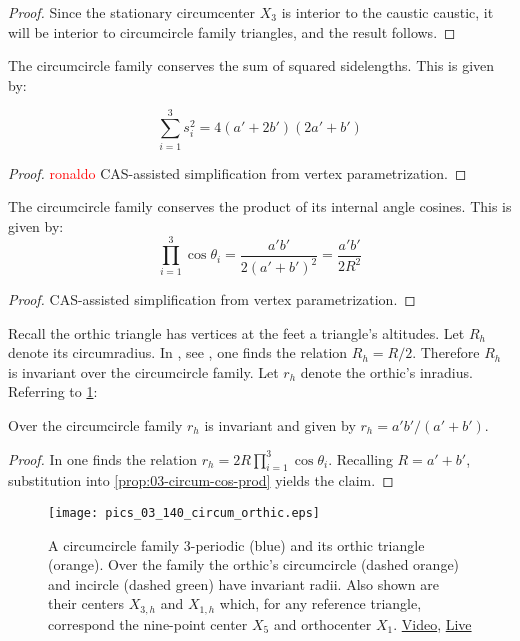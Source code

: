 \begin{proof}
Since the stationary circumcenter $X_3$ is interior to the caustic caustic, it will be interior to circumcircle family triangles, and the result follows.
\end{proof}

\begin{proposition}
The circumcircle family conserves the sum of squared sidelengths. This is given by:

\[ \sum_{i=1}^3 s_i^2=4(a' + 2 b')(2 a' + b') \]
\end{proposition}

\begin{proof}
\textcolor{red}{ronaldo}
CAS-assisted simplification from vertex parametrization.
\end{proof}

\begin{proposition}
The circumcircle family conserves the product of its internal angle cosines. This is given by:
\[ \prod_{i=1}^3{\cos\theta_i}=\frac{a' b'}{2(a'+b')^2}=\frac{a' b'}{2 R^2}\]
\label{prop:03-circum-cos-prod}
\end{proposition}

\begin{proof}
CAS-assisted simplification from vertex parametrization.
\end{proof}

Recall the orthic triangle has vertices at the feet a triangle's altitudes. Let $R_h$ denote its circumradius. In , see \cite[Orthic Triangle, Eqn 7]{mw}, one finds the relation $R_h=R/2$. Therefore $R_h$ is invariant over the circumcircle family. Let $r_h$ denote the orthic's inradius. Referring to \cref{fig:03-circum-orthic}:


\begin{proposition}
Over the circumcircle family  $r_h$ is invariant and  given by $r_h=a' b'/(a'+b')$. 
\label{prop:03-circumcircle-rh}
\end{proposition}

\begin{proof}
In \cite[Orthic Triangle, Eqn. 5]{mw} one finds the relation  $r_h=2 R \prod_{i=1}^3{\cos\theta_i}$. Recalling $R=a'+b'$, substitution into \cref{prop:03-circum-cos-prod} yields the claim.
\end{proof}

\begin{figure}
    \centering
    \texttt{[image: pics\_03\_140\_circum\_orthic.eps]}
    \caption{A circumcircle family 3-periodic (blue) and its orthic triangle (orange). Over the family the orthic's circumcircle (dashed orange) and incircle (dashed green) have invariant radii. Also shown are their centers $X_{3,h}$ and $X_{1,h}$ which, for any reference triangle, correspond the nine-point center $X_5$ and orthocenter $X_1$. \href{https://youtu.be/wUu2iMesv3U}{Video}, \href{https://bit.ly/2PHJZma}{Live}}
    \label{fig:03-circum-orthic}
\end{figure}


